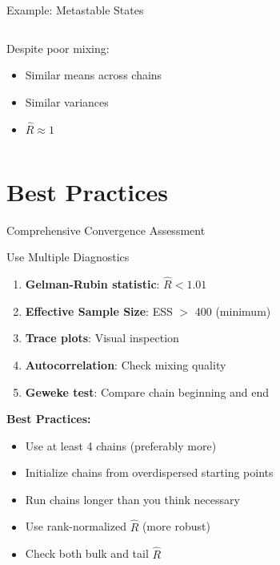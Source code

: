 \documentclass[aspectratio=169]{beamer}
\begin{document}
\begin{frame}{Example: Metastable States}
\begin{columns}
\begin{column}{0.5\textwidth}
\begin{center}
            \end{center}
            
            Despite poor mixing:\\
            \begin{itemize}
                \item Similar means across chains
                \item Similar variances
                \item $\hat{R} \approx 1$ 
            \end{itemize}
        \end{column}
    \end{columns}
\end{frame}

\section{Best Practices}

\begin{frame}{Comprehensive Convergence Assessment}
    \begin{block}{Use Multiple Diagnostics}
        \begin{enumerate}
            \item \textbf{Gelman-Rubin statistic}: $\hat{R} < 1.01$
            \item \textbf{Effective Sample Size}: ESS $>$ 400 (minimum)
            \item \textbf{Trace plots}: Visual inspection
            \item \textbf{Autocorrelation}: Check mixing quality
            \item \textbf{Geweke test}: Compare chain beginning and end
        \end{enumerate}
    \end{block}
    
    \vspace{0.5cm}
    \textbf{Best Practices:}
    \begin{itemize}
        \item Use at least 4 chains (preferably more)
        \item Initialize chains from overdispersed starting points
        \item Run chains longer than you think necessary
        \item Use rank-normalized $\hat{R}$ (more robust)
        \item Check both bulk and tail $\hat{R}$
    \end{itemize}
\end{frame}
\end{document}
